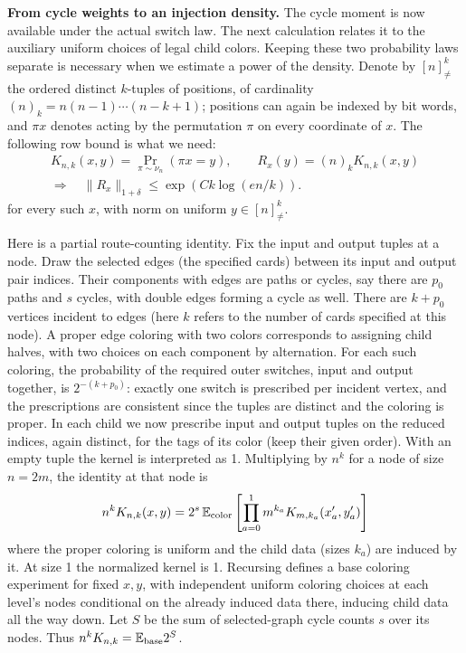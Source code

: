 \medskip\noindent\textbf{From cycle weights to an injection density.}\enspace
The cycle moment is now available under the actual switch law.  The next
calculation relates it to the auxiliary uniform choices of legal child
colors.  Keeping these two probability laws separate is necessary when
we estimate a power of the density.
Denote by \([n]_{\ne}^k\) the ordered distinct \(k\)-tuples of positions, of cardinality \((n)_k=n(n-1)\cdots(n-k+1)\); positions can again be indexed by bit words, and \(\pi x\) denotes acting by the permutation \(\pi\) on every coordinate of \(x\). The following row bound is what we need:
\begin{equation}
\begin{gathered}
K_{n,k}(x,y)=\Pr_{\pi\sim\nu_n}(\pi x=y),\qquad
 R_x(y)=(n)_kK_{n,k}(x,y)\\
\Longrightarrow\quad
 \|R_x\|_{1+\delta}\le\exp(Ck\log(en/k)).
\end{gathered}
\label{cas:e6}
\end{equation}
for every such \(x\), with norm on uniform \(y\in[n]_{\ne}^k\).

Here is a partial route-counting identity. Fix the input and output tuples at a node. Draw the selected edges (the specified cards) between its input and output pair indices. Their components with edges are paths or cycles, say there are \(p_0\) paths and \(s\) cycles, with double edges forming a cycle as well. There are \(k+p_0\) vertices incident to edges (here \(k\) refers to the number of cards specified at this node). A proper edge coloring with two colors corresponds to assigning child halves, with two choices on each component by alternation. For each such coloring, the probability of the required outer switches, input and output together, is \(2^{-(k+p_0)}\): exactly one switch is prescribed per incident vertex, and the prescriptions are consistent since the tuples are distinct and the coloring is proper. In each child we now prescribe input and output tuples on the reduced indices, again distinct, for the tags of its color (keep their given order). With an empty tuple the kernel is interpreted as 1. Multiplying by \(n^k\) for a node of size \(n=2m\), the identity at that node is
\[
n^k K_{n,k}(x,y)
=2^s\,\mathbb E_{\rm color}
  \left[\prod_{a=0}^1 m^{k_a} K_{m,k_a}(x'_a,y'_a)\right]
\]
where the proper coloring is uniform and the child data (sizes \(k_a\)) are induced by it. At size 1 the normalized kernel is 1. Recursing defines a base coloring experiment for fixed \(x,y\), with independent uniform coloring choices at each level's nodes conditional on the already induced data there, inducing child data all the way down. Let \(S\) be the sum of selected-graph cycle counts \(s\) over its nodes. Thus \(n^k K_{n,k}=\mathbb E_{\rm base} 2^S\).

